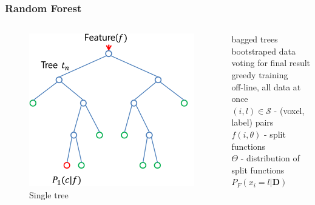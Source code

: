\documentclass[mathserif, 10pt]{beamer}
\begin{document}
\begin{frame}
\frametitle{Random Forest}

\begin{columns}
 \begin{column}{0.5\textwidth}
  \begin{figure}
  \center
  \includegraphics[width=\textwidth]{figures/rf}
  \caption{Single tree}
\end{figure}
 \end{column}
 \begin{column}{0.5\textwidth}
    bagged trees\\
    bootstraped data\\
    
    voting for final result\\
    greedy training\\
    off-line, all data at once\\
    $(i, l) \in \mathcal{S}$ - (voxel, label) pairs\\
    $f(i, \theta)$ - split functions\\
    $\Theta$ - distribution of split functions\\
    $P_F(x_i = l | \mathbf{D})$\\
 \end{column}

\end{columns}
\end{frame}
\end{document}
